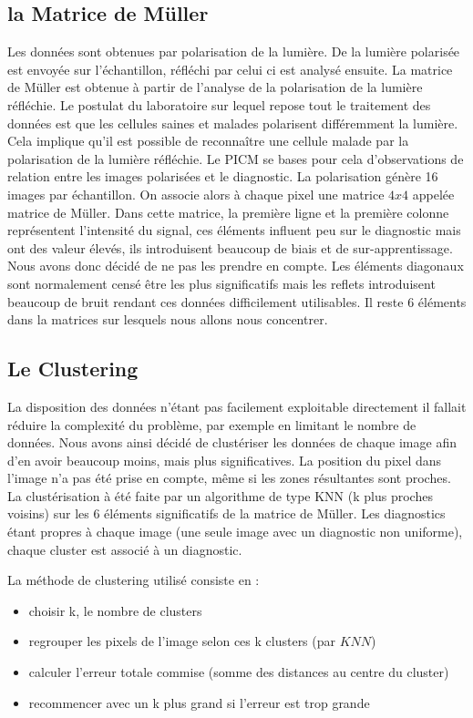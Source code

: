 \documentclass[a4paper,10pt]{report}
\begin{document}
\subsection{la Matrice de Müller}
Les données sont obtenues par polarisation de la lumière. De la lumière polarisée est envoyée sur l'échantillon, réfléchi par celui ci est analysé ensuite.
La matrice de Müller est obtenue à partir de l'analyse de la polarisation de la lumière réfléchie. Le postulat du laboratoire sur lequel repose tout le traitement des données est que les cellules saines et malades polarisent différemment la lumière. Cela implique qu'il est possible de reconnaître une cellule malade par la polarisation de la lumière réfléchie.
Le PICM se bases pour cela d'observations de relation entre les images polarisées et le diagnostic. 
La polarisation génère 16 images par échantillon. On associe alors à chaque pixel une matrice $4x4$ appelée matrice de Müller. Dans cette matrice, la première ligne et la première colonne représentent l'intensité du signal, ces éléments influent peu sur le diagnostic mais ont des valeur élevés, ils introduisent beaucoup de biais et de sur-apprentissage. Nous avons donc décidé de ne pas les prendre en compte. Les éléments diagonaux sont normalement censé être les plus significatifs mais les reflets introduisent beaucoup de bruit rendant ces données difficilement utilisables. Il reste 6 éléments dans la matrices sur lesquels nous allons nous concentrer. 

\subsection{Le Clustering}
La disposition des données n'étant pas facilement exploitable directement il fallait réduire la complexité du problème, par exemple en limitant le nombre de données. Nous avons ainsi décidé de clustériser les données de chaque image afin d'en avoir beaucoup moins, mais plus significatives. La position du pixel dans l'image n'a pas été prise en compte, même si les zones résultantes sont proches. La clustérisation à été faite par un algorithme de type KNN (k plus proches voisins) sur les $6$ éléments significatifs de la matrice de Müller. Les diagnostics étant propres à chaque image (une seule image avec un diagnostic non uniforme), chaque cluster est associé à un diagnostic. 

La méthode de clustering utilisé consiste en :
\begin{itemize}
\item choisir k, le nombre de clusters
\item regrouper les pixels de l'image selon ces k clusters (par $KNN$)
\item calculer l'erreur totale commise (somme des distances au centre du cluster)
\item recommencer avec un k plus grand si l'erreur est trop grande
\end{itemize}
\end{document}
